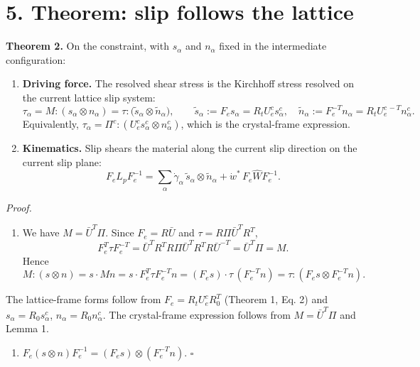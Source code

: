 \documentclass[
  11pt,
]{article}
\providecommand{\tightlist}{%
  \setlength{\itemsep}{0pt}\setlength{\parskip}{0pt}}
\begin{document}
\hypertarget{theorem-slip-follows-the-lattice}{%
\section{5. Theorem: slip follows the
lattice}\label{theorem-slip-follows-the-lattice}}

\textbf{Theorem 2.} On the constraint, with \(s_\alpha\) and
\(n_\alpha\) fixed in the intermediate configuration:

\begin{enumerate}
\def\labelenumi{\arabic{enumi}.}
\tightlist
\item
  \textbf{Driving force.} The resolved shear stress is the Kirchhoff
  stress resolved on the current lattice slip system:
  \[\tau_\alpha=M:(s_\alpha\otimes n_\alpha)=\tau:\bigl(\tilde s_\alpha\otimes\tilde n_\alpha\bigr),\qquad
  \tilde s_\alpha:=F_es_\alpha=R_tU_e^cs^c_\alpha,\quad \tilde n_\alpha:=F_e^{-T}n_\alpha=R_tU_e^{c\,-T}n^c_\alpha .\tag{3}\]
  Equivalently,
  \(\tau_\alpha=\Pi^c:(U_e^cs^c_\alpha\otimes n^c_\alpha)\), which is
  the crystal-frame expression.
\item
  \textbf{Kinematics.} Slip shears the material along the current slip
  direction on the current slip plane:
  \[F_eL_pF_e^{-1}=\sum_\alpha\dot\gamma_\alpha\,\tilde s_\alpha\otimes\tilde n_\alpha+\dot w^*\,F_e\widehat WF_e^{-1}. \tag{4}\]
\end{enumerate}

\emph{Proof.}

\begin{enumerate}
\def\labelenumi{(\arabic{enumi})}
\tightlist
\item
  We have \(M=\bar U^T\Pi\). Since \(F_e=R\bar U\) and
  \(\tau=R\Pi\bar U^TR^T\),
  \[F_e^T\tau F_e^{-T}=\bar U^TR^TR\Pi\bar U^TR^TR\bar U^{-T}=\bar U^T\Pi=M .\]
  Hence
  \[M:(s\otimes n)=s\cdot Mn=s\cdot F_e^T\tau F_e^{-T}n=(F_es)\cdot\tau\,(F_e^{-T}n)=\tau:(F_es\otimes F_e^{-T}n).\]
\end{enumerate}

The lattice-frame forms follow from \(F_e=R_tU_e^cR_0^T\) (Theorem 1,
Eq. 2) and \(s_\alpha=R_0s^c_\alpha\), \(n_\alpha=R_0n^c_\alpha\). The
crystal-frame expression follows from \(M=\bar U^T\Pi\) and Lemma 1.

\begin{enumerate}
\def\labelenumi{(\arabic{enumi})}
\setcounter{enumi}{1}
\tightlist
\item
  \(F_e(s\otimes n)F_e^{-1}=(F_es)\otimes(F_e^{-T}n)\). \(\square\)
\end{enumerate}
\end{document}
